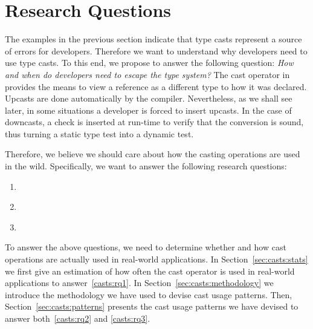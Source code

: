 \section{Research Questions}

The examples in the previous section indicate that type casts represent a source of errors for developers.
Therefore we want to understand why developers need to use type casts.
To this end, we propose to answer the following question:
\emph{How and when do developers need to escape the type system?}
%
%
The cast operator in \java{} provides the means to view a reference as a different type to how it was declared.
%
%
Upcasts are done automatically by the compiler.
Nevertheless, as we shall see later, in some situations a developer is forced to insert upcasts.
In the case of downcasts,
a check is inserted at run-time to verify that the conversion is sound,
%
%
thus turning a static type test into a dynamic test.

Therefore, we believe we should care about how the casting operations are used in the wild.
Specifically, we want to answer the following research questions:

\begin{enumerate}[label=$RQ/C\arabic*:$,ref=$RQ/C\arabic*$,leftmargin=3.4\parindent]
\item\label{casts:rq1}{\bf \crqA} \crqAdesc
\item\label{casts:rq2}{\bf \crqB} \crqBdesc
\item\label{casts:rq3}{\bf \crqC} \crqCdesc
\end{enumerate}

To answer the above questions, we need to determine whether and how cast operations are actually used in real-world \java{} applications.
In Section~\ref{sec:casts:stats} we first give an estimation of how often the cast operator is used in real-world applications to answer~\ref{casts:rq1}.
In Section~\ref{sec:casts:methodology} we introduce the methodology we have used to devise cast usage patterns.
Then, Section~\ref{sec:casts:patterns} presents the cast usage patterns we have devised to answer both~\ref{casts:rq2} and \ref{casts:rq3}.
